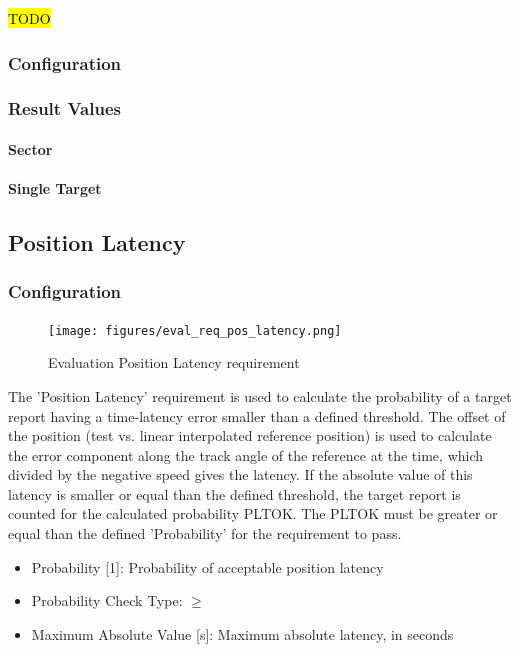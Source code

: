 \hl{TODO}

\subsubsection{Configuration}

\subsubsection{Result Values}

\paragraph{Sector}
\paragraph{Single Target}

\subsection{Position Latency}
\label{sec:eval_req_pos_latency} 

\subsubsection{Configuration}

\begin{figure}[H]
    \texttt{[image: figures/eval\_req\_pos\_latency.png]}
  \caption{Evaluation Position Latency requirement}
\end{figure}

The 'Position Latency' requirement is used to calculate the probability of a target report having a time-latency error smaller than a defined threshold. The offset of the position (test vs. linear interpolated reference position) is used to calculate the error component along the track angle of the reference at the time, which divided by the negative speed gives the latency. If the absolute value of this latency is smaller or equal than the defined threshold, the target report is counted for the calculated probability PLTOK. The PLTOK must be greater or equal than the defined 'Probability' for the requirement to pass. \\

\begin{itemize}  
\item Probability [1]: Probability of acceptable position latency
\item Probability Check Type: $\geq$
\item Maximum Absolute Value [s]: Maximum absolute latency, in seconds
\end{itemize}
\ \\

